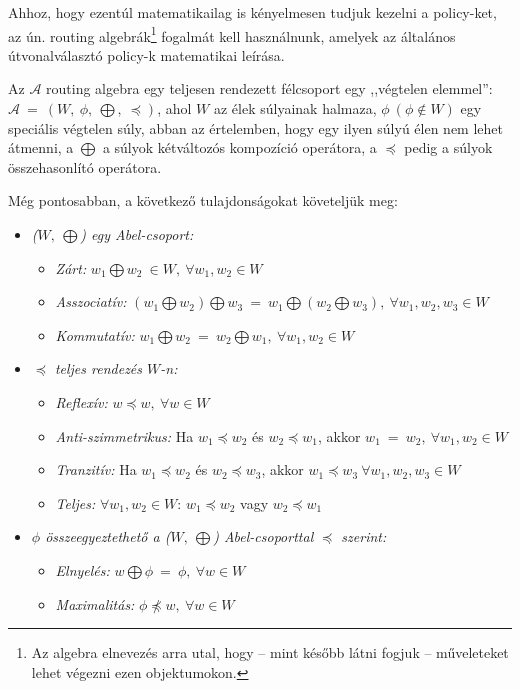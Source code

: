   Ahhoz, hogy ezentúl matematikailag is kényelmesen tudjuk kezelni a policy-ket, az ún. routing algebrák\footnote{Az algebra elnevezés arra utal, hogy -- mint később látni fogjuk -- műveleteket lehet végezni ezen objektumokon.} fogalmát kell használnunk, amelyek az általános útvonalválasztó policy-k matematikai leírása\cite{Sobrinho_Algebra_and_Algorithms, Compact_Policy_Routing}.

  \begin{definition} 
    Az $\mathcal{A}$ routing algebra egy teljesen rendezett félcsoport egy ,,végtelen elemmel'': $\mathcal{A}~=~(W,~\phi,~\bigoplus,~\preceq)$, ahol $W$ az élek súlyainak halmaza, $\phi~(\phi \notin W)$ egy speciális végtelen súly, abban az értelemben, hogy egy ilyen súlyú élen nem lehet átmenni, a $\bigoplus$ a súlyok kétváltozós kompozíció operátora, a $\preceq$ pedig a súlyok összehasonlító operátora.
  \end{definition}

  Még pontosabban, a következő tulajdonságokat követeljük meg:
  \begin{itemize}
    \item \emph{ ($W,~\bigoplus$) egy Abel-csoport:}
    \begin{itemize}
    \item \emph{ Zárt:} $w_{1} \bigoplus w_{2}~\in W, ~\forall w_{1}, w_{2}\in W$
    \item \emph{ Asszociatív:} $(w_{1} \bigoplus w_{2}) \bigoplus w_{3}~=~w_{1} \bigoplus (w_{2} \bigoplus w_{3}),~\forall w_{1}, w_{2}, w_{3}\in W$
    \item \emph{ Kommutatív:} $w_{1} \bigoplus w_{2}~=~w_{2} \bigoplus w_{1},~\forall w_{1}, w_{2}\in W$
    \end{itemize}
    \item \emph{ $\preceq$ teljes rendezés $W$-n:}
    \begin{itemize}
    \item \emph{ Reflexív:} $w \preceq w,~\forall w \in W$
    \item \emph{ Anti-szimmetrikus:} Ha $w_{1} \preceq w_{2}$ és $w_{2} \preceq w_{1}$, akkor $w_{1} ~=~ w_{2},~\forall w_{1}, w_{2} \in W$
    \item \emph{ Tranzitív:} Ha $w_{1} \preceq w_{2}$ és $w_{2} \preceq w_{3}$, akkor $w_{1} \preceq w_{3}~\forall w_{1}, w_{2}, w_{3} \in W$
    \item \emph{ Teljes:} $\forall w_{1}, w_{2} \in W$: $w_{1} \preceq w_{2}$ vagy $w_{2} \preceq w_{1}$
    \end{itemize}
    \item \emph{ $\phi$ összeegyeztethető a ($W,~\bigoplus$) Abel-csoporttal $\preceq$ szerint:}
    \begin{itemize}
    \item \emph{ Elnyelés:} $w \bigoplus \phi ~=~ \phi, ~\forall w \in W$
    \item \emph{ Maximalitás:} $\phi \npreceq w, ~\forall w \in W$
    \end{itemize}
  \end{itemize}

